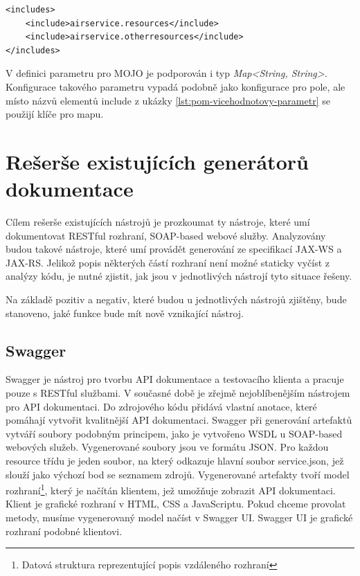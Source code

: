 \documentclass[11pt,twoside,a4paper]{book}
\begin{document}
\begin{lstlisting}[frame=single,caption={Konfigurace vícehodnotového parametru v
pom.xml},label={lst:pom-vicehodnotovy-parametr}] 
<includes>
    <include>airservice.resources</include>
    <include>airservice.otherresources</include>
</includes>
\end{lstlisting}

V definici parametru pro MOJO je podporován i typ {\em Map<String, String>}.
Konfigurace takového parametru vypadá podobně jako konfigurace pro pole, ale místo názvů elementů
include z ukázky \ref{lst:pom-vicehodnotovy-parametr} se použijí klíče pro mapu.

\section{Rešerše existujících generátorů dokumentace}
\label{sec:reserse-existujicich-generatoru}

Cílem rešerše existujících nástrojů je prozkoumat ty nástroje, které umí
dokumentovat RESTful rozhraní, SOAP-based webové služby. Analyzovány budou
takové nástroje, které umí provádět generování ze specifikací JAX-WS a JAX-RS.
Jelikož popis některých částí rozhraní není možné staticky vyčíst z analýzy
kódu, je nutné zjistit, jak jsou v jednotlivých nástrojí tyto situace řešeny.

Na základě pozitiv a negativ, které budou u jednotlivých nástrojů zjištěny, bude stanoveno,
jaké funkce bude mít nově vznikající nástroj.

\subsection{Swagger}
\label{subsec:swagger}

Swagger \cite{SwaggerHome} je nástroj pro tvorbu API dokumentace a testovacího
klienta a pracuje pouze s RESTful službami.
V současné době je zřejmě nejoblíbenějším nástrojem pro API dokumentaci. Do
zdrojového kódu přidává vlastní anotace, které pomáhají vytvořit kvalitnější API
dokumentaci. Swagger při generování artefaktů vytváří soubory podobným
principem, jako je vytvořeno WSDL u SOAP-based webových služeb. Vygenerované
soubory jsou ve formátu JSON. Pro každou resource třídu je jeden soubor, na
který odkazuje hlavní soubor service.json, jež slouží jako výchozí bod se
seznamem zdrojů. Vygenerované artefakty tvoří model rozhraní\footnote{Datová
struktura reprezentující popis vzdáleného rozhraní}, který je načítán klientem,
jež umožňuje zobrazit API dokumentaci.
Klient je grafické rozhraní v HTML, CSS a JavaScriptu. Pokud chceme provolat
metody, musíme vygenerovaný model načíst v Swagger UI. Swagger UI je grafické
rozhraní podobné klientovi.
\end{document}
